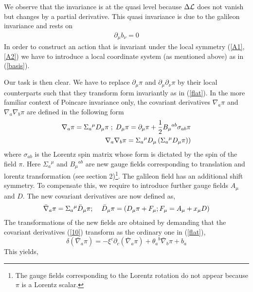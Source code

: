 \documentclass[12pt]{article}
\begin{document}
We observe that the invariance is at the quasi level because $\Delta {\cal{L}}$ does not vanish but changes by a partial derivative. This quasi invariance is due to the galileon invariance and rests on 
\begin{eqnarray}
\partial_\mu b_\nu = 0 \label{cond1}
\end{eqnarray}
In order to construct an action that is invariant under the local symmetry (\ref{A1}, \ref{A2}) we have to introduce a local coordinate system (as mentioned above) as in (\ref{basis}).
   
   Our task is then clear. We have to replace $\partial_\mu\pi$ and $\partial_\mu\partial_\nu\pi$
   by their local counterparts %
    such that they transform form
   invariantly as in (\ref{flat}).
  In the more familiar context of Poincare invariance only, the covariant derivatives $\nabla_a\pi$ and $\nabla_a\nabla_b\pi$  are defined in the following form \cite{HB, M1}
  \begin{eqnarray}
 \nabla_a\pi = \Sigma_a{}^\mu D_\mu \pi\hskip.1cm ;\hskip.1cm D_\mu \pi = \partial_\mu \pi + \frac{1}{2}B_\mu{}^{ab}\sigma_{ab}\pi
 \label{cov1}\\
 \nabla_a \nabla_b \pi = \Sigma_a{}^\mu D_\mu \left(\Sigma_a{}^\mu D_\mu \pi\right)\label{cov2})
\end{eqnarray} 
where $\sigma_{ab}$ is the Lorentz spin matrix whose form is dictated by the spin of the field $\pi$.  Here $\Sigma_a{}^\mu$ and $B_\mu{}^{ab}$ are new gauge fields corresponding to translation and lorentz transformation (see section 2)\footnote{The gauge fields corresponding to the Lorentz rotation do not appear because $\pi$ is a Lorentz scalar. }. The galileon field has an additional shift symmetry. To compensate this, we require to introduce further gauge fields $A_{\mu}$ and $D$. The new covariant derivatives are now defined as,
   \begin{eqnarray}
   {\bar{\nabla}}_a\pi = \Sigma_a{}^\mu{\bar{ D}}_\mu \pi;\hskip .4cm {\bar{ D}}_\mu \pi = \left(D_\mu\pi + F_\mu; F_\mu = A_\mu 
   + x_\mu D\right)\label{10}
   \end{eqnarray}
  The transformations of the new fields are obtained by demanding that the covariant derivatives (\ref{10}) transform as the ordinary one in (\ref{flat}),
 \begin{equation}
 \delta({\bar{\nabla}}_a\pi)=-\xi^c \partial_c({\bar{\nabla}}_a
 \pi)+{\theta_a}^b{\bar{\nabla}}_b\pi
 +b_a
 \end{equation}
 This yields,
\end{document}
